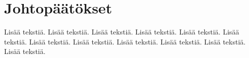 \chapter{Johtopäätökset} \label{Toinen luku}

Lisää tekstiä. Lisää tekstiä. Lisää tekstiä. Lisää tekstiä. Lisää
tekstiä. Lisää tekstiä. Lisää tekstiä. Lisää tekstiä. Lisää tekstiä.
Lisää tekstiä. Lisää tekstiä. Lisää tekstiä.
